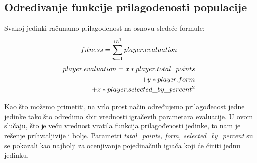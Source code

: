 \documentclass[a4paper]{article}
\begin{document}
\subsection{Određivanje funkcije prilagođenosti populacije}
\label{sec:playerEvaluacija}
Svakoj jedinki računamo prilagođenost na osnovu sledeće formule: 
	\begin{gather*}
		 fitness = \sum_{n=1}^{15 \footnotemark } player.evaluation \\
	\end{gather*}
	\begin{gather*}
		\begin{aligned}
		player.evaluation = x*player.total\_points \\ + y*player.form \\ + z*player.selected\_by\_percent \footnotemark \\
		\end{aligned}
	\end{gather*}

Kao što možemo primetiti, na vrlo prost način određujemo prilagođenost jedne jedinke tako što odredimo zbir vrednosti igračevih parametara evaluacije. U ovom slučaju, što je veću vrednost vratila funkcija prilagođenosti jedinke, to nam je rešenje prihvatljivije i bolje. Parametri \textit{total\_points, form, selected\_by\_percent} su se pokazali kao najbolji za ocenjivanje pojedinačnih igrača koji će činiti jednu jedinku.
\end{document}
